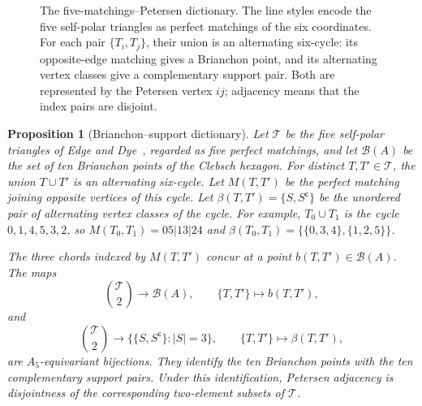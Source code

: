 \documentclass[11pt]{article}
\newtheorem{proposition}[theorem]{Proposition}
\theoremstyle{definition}
\theoremstyle{remark}
\begin{document}
\begin{figure}[H]
\caption{The five-matchings--Petersen dictionary. The line styles encode
the five self-polar triangles as perfect matchings of the six coordinates.
For each pair $\{T_i,T_j\}$, their union is an alternating six-cycle: its
opposite-edge matching gives a Brianchon point, and its alternating vertex
classes give a complementary support pair. Both are represented by the
Petersen vertex $ij$; adjacency means that the index pairs are disjoint.}
\label{fig:synthematic-petersen}
\end{figure}

\begin{proposition}[Brianchon--support dictionary]
\label{prop:brianchon-support}
Let $\mathcal T$ be the five self-polar triangles of Edge and
Dye~\cite{Edge1956,Dye1991}, regarded as five perfect matchings, and let
$\mathcal B(A)$ be the set of ten
Brianchon points of the Clebsch hexagon. For distinct $T,T'\in\mathcal T$,
the union $T\cup T'$ is an alternating six-cycle. Let $M(T,T')$ be the
perfect matching joining opposite vertices of this cycle. Let
$\beta(T,T')=\{S,S^{\mathsf c}\}$ be the unordered pair of alternating
vertex classes of the cycle.
For example, $T_0\cup T_1$ is the cycle
$0,1,4,5,3,2$, so $M(T_0,T_1)=05|13|24$ and
$\beta(T_0,T_1)=\{\{0,3,4\},\{1,2,5\}\}$.

The three chords indexed by $M(T,T')$ concur at a point $b(T,T')\in
\mathcal B(A)$. The maps
\[
 \binom{\mathcal T}{2}\longrightarrow\mathcal B(A),
 \qquad \{T,T'\}\longmapsto b(T,T'),
\]
and
\[
 \binom{\mathcal T}{2}\longrightarrow
 \bigl\{\{S,S^{\mathsf c}\}:|S|=3\bigr\},
 \qquad \{T,T'\}\longmapsto\beta(T,T'),
\]
are $A_5$-equivariant bijections. They identify the ten Brianchon points
with the ten complementary support pairs. Under this identification,
Petersen adjacency is disjointness of the corresponding two-element
subsets of $\mathcal T$.
\end{proposition}
\end{document}
